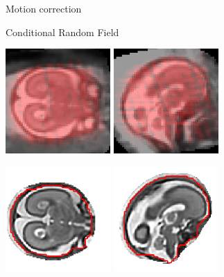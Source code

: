 \documentclass[12pt]{beamer}
\begin{document}
\begin{frame}{Motion correction}

\centering

Conditional Random Field

\vspace{0.02\textheight}

 \includegraphics[width=0.3\textwidth]{3599_probabeforeCRFXY.png}
\hspace{0.01\textwidth}
 \includegraphics[width=0.3\textwidth]{3599_probabeforeCRFXZ.png}

 \includegraphics[width=0.3\textwidth, clip=true, trim=0 30 0 20]{3599_reconstructedXY.png}
\hspace{0.01\textwidth}
 \includegraphics[width=0.3\textwidth, clip=true, trim=0 30 0 20]{3599_reconstructedXZ.png}

\end{frame}
\end{document}
